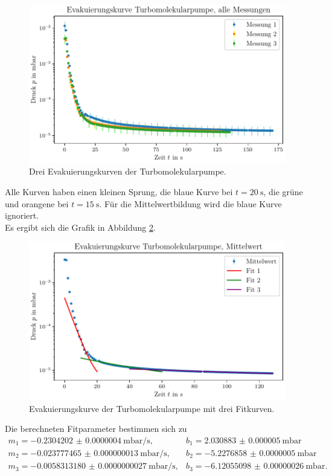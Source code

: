 \begin{figure}[H]
    \centering
    \includegraphics[width=\textwidth]{plots/TP_Evakuierungskurve_alle.pdf}
    \caption{Drei Evakuierungskurven der Turbomolekularpumpe.}
    \label{fig:TP_evak_alle}
\end{figure}

Alle Kurven haben einen kleinen Sprung, die blaue Kurve bei $t = \SI{20}{\second}$, die grüne und orangene bei $t = \SI{15}{\second}$.
Für die Mittelwertbildung wird die blaue Kurve ignoriert. \\
Es ergibt sich die Grafik in Abbildung \ref{fig:TP_evak}.

\begin{figure}[H]
    \centering
    \includegraphics[width=\textwidth]{plots/TP_Evakuierungskurve.pdf}
    \caption{Evakuierungskurve der Turbomolekularpumpe mit drei Fitkurven.}
    \label{fig:TP_evak}
\end{figure}

Die berechneten Fitparameter bestimmen sich zu 
\begin{align}
    m_1 = \qty[separate-uncertainty=false]{-0.2304202(4)}{\milli\bar\per\second}, & b_1 = \qty[separate-uncertainty=false]{2.030883(5)}{\milli\bar} \\
    m_2 = \qty[separate-uncertainty=false]{-0.023777465(13)}{\milli\bar\per\second}, & b_2 = \qty[separate-uncertainty=false]{-5.2276858(5)}{\milli\bar}\\
    m_3 = \qty[separate-uncertainty=false]{-0.0058313180(27)}{\milli\bar\per\second}, & b_3 = \qty[separate-uncertainty=false]{-6.12055098(26)}{\milli\bar}.
\end{align}


